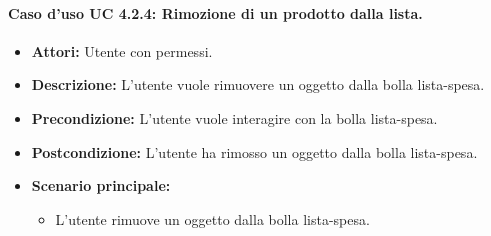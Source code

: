 \paragraph{Caso d'uso UC 4.2.4: Rimozione di un prodotto dalla lista.}
\label{Caso d'uso UC 4.2.4: Rimozione di un prodotto dalla lista.}

\FloatBarrier
\begin{itemize}
\item \textbf{Attori:} Utente con permessi.
\item \textbf{Descrizione:} L'utente vuole rimuovere un oggetto dalla bolla lista-spesa.
\item \textbf{Precondizione:} L'utente vuole interagire con la bolla lista-spesa. 
\item \textbf{Postcondizione:} L'utente ha rimosso un oggetto dalla bolla lista-spesa.
\item \textbf{Scenario principale:}
	\begin{itemize}
	\item{L'utente rimuove un oggetto dalla bolla lista-spesa.}
	\end{itemize}
\end{itemize}